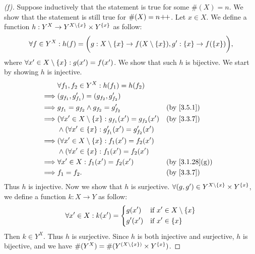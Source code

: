 \begin{proof}[(f)]
	Suppose inductively that the statement is true for some \(\#(X) = n\).
	We show that the statement is still true for \(\#(X) = n\!+\!\!+\).
	Let \(x \in X\).
	We define a function \(h : Y^X \to Y^{X \setminus \left\lbrace x\right\rbrace} \times Y^{\left\lbrace x\right\rbrace}\) as follow:
	\[
		\forall f \in Y^X : h(f) = \bigg(g : X \setminus \left\lbrace x\right\rbrace \to f(X \setminus \left\lbrace x\right\rbrace), g' : \left\lbrace x\right\rbrace \to f(\left\lbrace x\right\rbrace)\bigg),
	\]
	where \(\forall x' \in X \setminus \left\lbrace x\right\rbrace : g(x') = f(x')\).
	We show that such \(h\) is bijective.
	We start by showing \(h\) is injective.
	\begin{align*}
		         & \forall f_1, f_2 \in Y^X : h(f_1) = h(f_2)                                                        \\
		\implies & (g_{f_1}, g_{f_1}') = (g_{f_2}, g_{f_2}')                                                         \\
		\implies & g_{f_1} = g_{f_2} \land g_{f_2} = g_{f_2}'                      &  & \by{3.5.1}                   \\
		\implies & (\forall x' \in X \setminus \set{x} : g_{f_1}(x') = g_{f_2}(x') &  & \by{3.3.7}                   \\
		         & \land (\forall x' \in \set{x} : g_{f_1}'(x') = g_{f_2}'(x')                                       \\
		\implies & (\forall x' \in X \setminus \set{x} : f_1(x') = f_2(x')                                           \\
		         & \land (\forall x' \in \set{x} : f_1(x') = f_2(x')                                                 \\
		\implies & \forall x' \in X : f_1(x') = f_2(x')                            &  & \text{(by \cref{3.1.28}(g))} \\
		\implies & f_1 = f_2.                                                      &  & \by{3.3.7}
	\end{align*}
	Thus \(h\) is injective.
	Now we show that \(h\) is surjective.
	\(\forall (g, g') \in Y^{X \setminus \left\lbrace x\right\rbrace} \times Y^{\left\lbrace x\right\rbrace}\), we define a function \(k : X \to Y\) as follow:
	\[
		\forall x' \in X : k(x') = \begin{dcases}
			g(x')  & \text{if } x' \in X \setminus \left\lbrace x\right\rbrace \\
			g'(x') & \text{if } x' \in \left\lbrace x\right\rbrace
		\end{dcases}
	\]
	Then \(k \in Y^X\).
	Thus \(h\) is surjective.
	Since \(h\) is both injective and surjective, \(h\) is bijective, and we have \(\#(Y^X) = \#(Y^{(X \setminus \left\lbrace x\right\rbrace)} \times Y^{\left\lbrace x\right\rbrace})\).

\end{proof}
